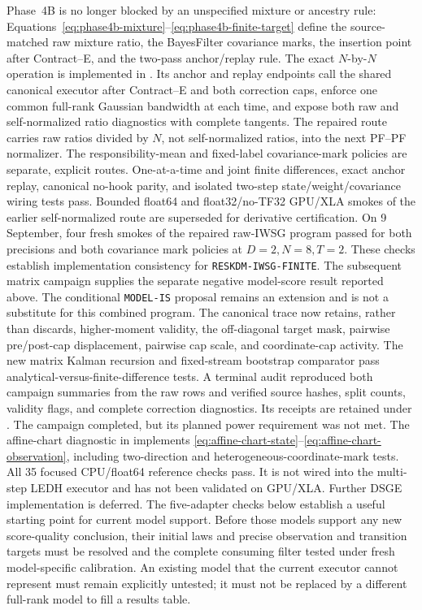 \documentclass[11pt]{article}
\begin{document}
Phase~4B is no longer blocked by an unspecified mixture or ancestry rule:
Equations~\eqref{eq:phase4b-mixture}--\eqref{eq:phase4b-finite-target} define
the source-matched raw mixture ratio, the BayesFilter covariance marks,
the insertion point after Contract--E, and the two-pass anchor/replay rule.
The exact $N$-by-$N$ operation is implemented in
.  Its anchor and
replay endpoints call the shared canonical executor after Contract--E and both
correction caps, enforce one common full-rank Gaussian bandwidth at each time,
and expose both raw and self-normalized ratio diagnostics with complete
tangents.  The repaired route carries raw ratios divided by $N$, not
self-normalized ratios, into the next PF--PF normalizer.  The
responsibility-mean and fixed-label covariance-mark policies are separate,
explicit routes.  One-at-a-time and joint finite
differences, exact anchor replay, canonical no-hook parity, and isolated
two-step state/weight/covariance wiring tests pass.  Bounded float64 and
float32/no-TF32 GPU/XLA smokes of the earlier self-normalized route are
superseded for derivative certification.  On 9 September, four fresh smokes
of the repaired raw-IWSG program passed for both precisions and both covariance
mark policies at $D=2,N=8,T=2$.  These checks establish implementation
consistency for \texttt{RESKDM-IWSG-FINITE}.  The subsequent matrix campaign
supplies the separate negative model-score result reported above.  The
conditional \texttt{MODEL-IS} proposal
remains an extension and is not a substitute for this combined program.
The canonical trace now retains, rather than discards, higher-moment validity,
the off-diagonal target mask, pairwise pre/post-cap displacement, pairwise cap
scale, and coordinate-cap activity.  The new matrix Kalman recursion and
fixed-stream bootstrap comparator pass analytical-versus-finite-difference
tests.  A terminal audit reproduced both campaign summaries from the raw rows
and verified source hashes, split counts, validity flags, and complete
correction diagnostics.  Its receipts are retained under
.
The campaign completed, but its planned power requirement was not met.  The
affine-chart diagnostic in
implements \eqref{eq:affine-chart-state}--\eqref{eq:affine-chart-observation},
including two-direction and heterogeneous-coordinate-mark tests.  All 35
focused CPU/float64 reference checks pass.  It is not wired into the
multi-step LEDH executor and has not been validated on GPU/XLA.  Further DSGE
implementation is deferred. The five-adapter checks below establish a useful
starting point for current model support. Before those models support any
new score-quality conclusion, their initial laws and precise observation and
transition targets must be resolved and the complete consuming filter tested
under fresh model-specific calibration.  An existing model
that the current executor cannot represent must remain explicitly untested;
it must not be replaced by a different full-rank model to fill a results table.
\end{document}
